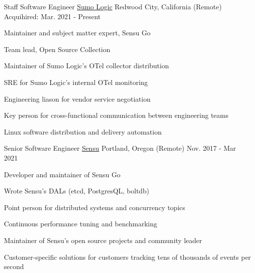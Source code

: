 

\begin{cventries}

  \cventry
    {Staff Software Engineer} %
	{\href{https://www.sumologic.com}{Sumo Logic}} %
	{Redwood City, California (Remote)} %
    {Acquihired: Mar. 2021 - Present} %
    {
      \begin{cvitems} %
        \item {Maintainer and subject matter expert, Sensu Go}
        \item {Team lead, Open Source Collection}
    	\item {Maintainer of Sumo Logic's OTel collector distribution}
    	\item {SRE for Sumo Logic's internal OTel monitoring}
    	\item {Engineering liason for vendor service negotiation}
    	\item {Key person for cross-functional communication between engineering teams}
    	\item {Linux software distribution and delivery automation}
      \end{cvitems}
    }


  \cventry
	{Senior Software Engineer}
	{\href{https://sensu.io}{Sensu}}
	{Portland, Oregon (Remote)}
	{Nov. 2017 - Mar 2021}
	{
	  \begin{cvitems}
		\item {Developer and maintainer of Sensu Go}
		\item {Wrote Sensu's DALs (etcd, PostgresQL, boltdb)}
		\item {Point person for distributed systems and concurrency topics}
		\item {Continuous performance tuning and benchmarking}
		\item {Maintainer of Sensu's open source projects and community leader}
		\item {Customer-specific solutions for customers tracking tens of thousands of events per second}
	  \end{cvitems}
	}



\end{cventries}
